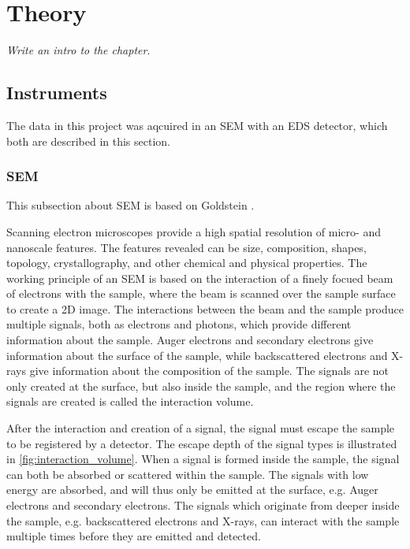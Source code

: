 \chapter{Theory}
\label{ch:theory}

\emph{Write an intro to the chapter}.

\section{Instruments}
\label{sec:instruments}

The data in this project was aqcuired in an SEM with an EDS detector, which both are described in this section.


\subsection{SEM}
\label{theory:instruments:sem}

This subsection about SEM is based on Goldstein \cite{goldstein_scanning_2018}.

Scanning electron microscopes provide a high spatial resolution of micro- and nanoscale features.
The features revealed can be size, composition, shapes, topology, crystallography, and other chemical and physical properties. %
The working principle of an SEM is based on the interaction of a finely focued beam of electrons with the sample, where the beam is scanned over the sample surface to create a 2D image.
The interactions between the beam and the sample produce multiple signals, both as electrons and photons, which provide different information about the sample.
Auger electrons and secondary electrons give information about the surface of the sample, while backscattered electrons and X-rays give information about the composition of the sample.
The signals are not only created at the surface, but also inside the sample, and the region where the signals are created is called the interaction volume.

After the interaction and creation of a signal, the signal must escape the sample to be registered by a detector.
The escape depth of the signal types is illustrated in \cref{fig:interaction_volume}.
When a signal is formed inside the sample, the signal can both be absorbed or scattered within the sample.
The signals with low energy are absorbed, and will thus only be emitted at the surface, e.g. Auger electrons and secondary electrons.
The signals which originate from deeper inside the sample, e.g. backscattered electrons and X-rays, can interact with the sample multiple times before they are emitted and detected.

